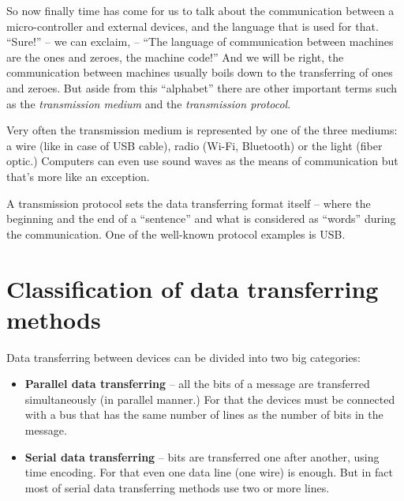 \documentclass[../sparc.tex]{subfiles}
\begin{document}

So now finally time has come for us to talk about the communication between a
micro-controller and external devices, and the language that is used for that.
``Sure!'' -- we can exclaim, -- ``The language of communication between machines
are the ones and zeroes, the machine code!''  And we will be right, the
communication between machines usually boils down to the transferring of ones
and zeroes.  But aside from this ``alphabet'' there are other important terms
such as the \emph{transmission medium} and the \emph{transmission protocol}.

Very often the transmission medium is represented by one of the three mediums: a
wire (like in case of USB cable), radio (Wi-Fi, Bluetooth) or the light (fiber
optic.)  Computers can even use sound waves as the means of communication but
that's more like an exception.

A transmission protocol sets the data transferring format itself -- where the
beginning and the end of a ``sentence'' and what is considered as ``words''
during the communication.  One of the well-known protocol examples is USB.

\section{Classification of data transferring methods}


Data transferring between devices can be divided into two big categories:

\begin{itemize}
\item \textbf{Parallel data transferring} -- all the bits of a message are
  transferred simultaneously (in parallel manner.)  For that the devices must be
  connected with a bus that has the same number of lines as the number of bits
  in the message.
\item \textbf{Serial data transferring} -- bits are transferred one after
  another, using time encoding.  For that even one data line (one wire) is
  enough.  But in fact most of serial data transferring methods use two or more
  lines.
\end{itemize}

\end{document}

